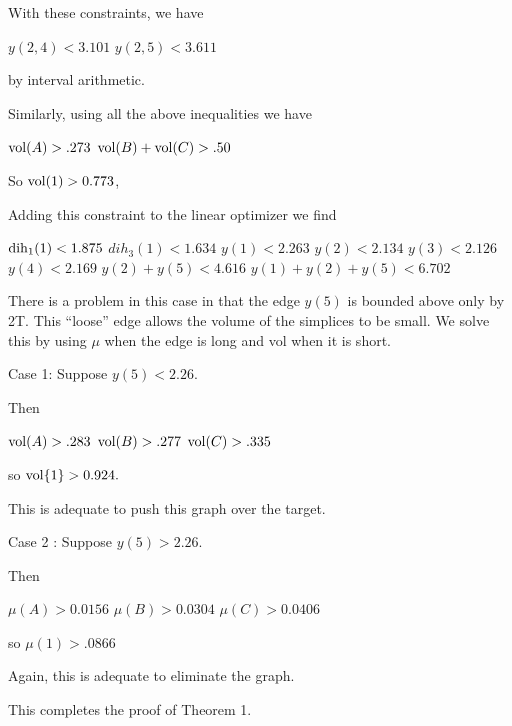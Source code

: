 With these constraints, we have

$y(2,4) < 3.101$ \newline
$y(2,5) < 3.611$ \newline

by interval arithmetic.

Similarly, using all the above inequalities we have

$\operatorname{vol}(A) > .273$ \newline
$\operatorname{vol}(B)+\operatorname{vol}(C) > .50$ \newline

So $\operatorname{vol}(1)>0.773$,

Adding this constraint to the linear optimizer we find

$\operatorname{dih}_1(1)<1.875$ \newline
$dih_3(1)<1.634$ \newline
$y(1)<2.263$ \newline
$y(2)<2.134$ \newline
$y(3)<2.126$ \newline
$y(4)<2.169$ \newline
$y(2)+y(5)<4.616$ \newline
$y(1)+y(2)+y(5)<6.702$ \newline

There is a problem in this case in that the edge $y(5)$ is bounded above only by 2T.  This ``loose'' edge allows the volume of the simplices to be small.
We solve this by using $\mu$ when the edge is long and vol when it is short.

Case 1: Suppose $y(5)<2.26$.

Then 

$\operatorname{vol}(A)>.283$ \newline
$\operatorname{vol}(B)>.277$ \newline
$\operatorname{vol}(C)>.335$ \newline

so $\operatorname{vol}\{1\}>0.924.$  

This is adequate to push this graph over the target.

Case 2 : Suppose $y(5)>2.26.$

Then

$\mu(A)>0.0156$ \newline
$\mu(B)>0.0304$ \newline
$\mu(C)>0.0406$ \newline

so $\mu(1)>.0866$

Again, this is adequate to eliminate the graph.

This completes the proof of Theorem 1.

